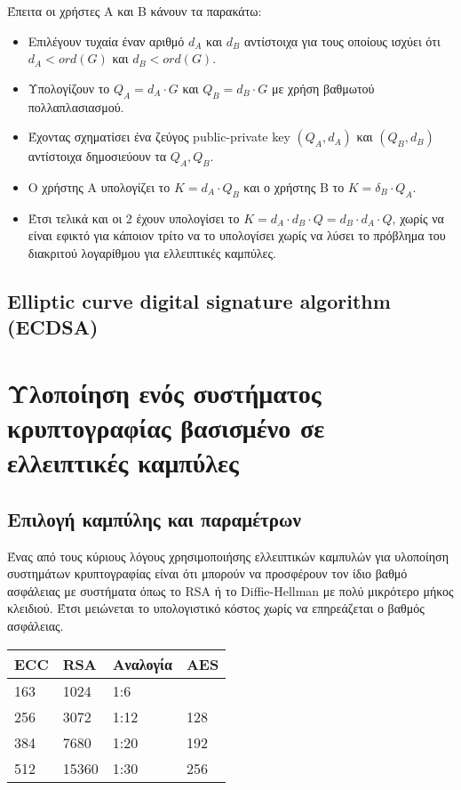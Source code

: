 \documentclass[12pt]{article}
\begin{document}
 Έπειτα οι χρήστες Α και Β κάνουν τα παρακάτω:
\begin{itemize}
\item Επιλέγουν τυχαία έναν αριθμό $d_A$ και $d_B$ αντίστοιχα για τους οποίους ισχύει ότι $d_Α < ord(G)$ και $d_B < ord(G)$.
\item Υπολογίζουν το $Q_Α = d_A \cdot G$ και $Q_Β = d_Β \cdot G$ με χρήση βαθμωτού πολλαπλασιασμού.
\item Έχοντας σχηματίσει ένα ζεύγος public-private key $(Q_Α,d_Α)$ και $(Q_B, d_B)$ αντίστοιχα δημοσιεύουν τα $Q_A, Q_B$.
\item Ο χρήστης Α υπολογίζει το $K = d_A \cdot Q_B$ και ο χρήστης Β το $K = δ_Β \cdot Q_A$.
\item Έτσι τελικά και οι 2 έχουν υπολογίσει το $K = d_A \cdot d_B \cdot Q = d_B \cdot d_A \cdot Q$, χωρίς να είναι εφικτό για κάποιον τρίτο να το υπολογίσει χωρίς να λύσει το πρόβλημα του διακριτού λογαρίθμου για ελλειπτικές καμπύλες.
\end{itemize}
\subsection{Elliptic curve digital signature algorithm (ECDSA)}

\pagebreak

\section{Υλοποίηση ενός συστήματος κρυπτογραφίας βασισμένο σε ελλειπτικές καμπύλες}
\subsection{Επιλογή καμπύλης και παραμέτρων}
Ένας από τους κύριους λόγους χρησιμοποιήσης ελλειπτικών καμπυλών για υλοποίηση συστημάτων κρυπτογραφίας είναι ότι μπορούν να προσφέρουν τον ίδιο βαθμό ασφάλειας με συστήματα όπως το RSA ή το Diffie-Hellman με πολύ μικρότερο μήκος κλειδιού. Έτσι μειώνεται το υπολογιστικό κόστος χωρίς να επηρεάζεται ο βαθμός ασφάλειας.
\\ \medskip

\begin{center}
\begin{tabular}{|l|l|l|l|} \hline
\textbf{ECC} & \textbf{RSA} & \textbf{Αναλογία} & \textbf{AES} \\ \hline
163 & 1024 & 1:6 & \\ \hline
256 & 3072 & 1:12 & 128 \\ \hline
384 & 7680 & 1:20 & 192 \\ \hline
512 & 15360 & 1:30 & 256 \\ \hline
\end{tabular} \\
\end{center}
\end{document}
